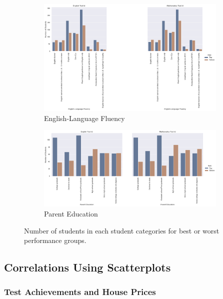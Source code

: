 \documentclass[11pt]{article}
\begin{document}
\begin{figure}[h!]
\begin{subfigure}{0.5\textwidth}
         \centering
         \includegraphics[width=\textwidth]{output_57_0.png}
         \caption{English-Language Fluency}
         \label{fig:num_best_worst_counties_english}
\end{subfigure}
\hfill
\begin{subfigure}{0.5\textwidth}
         \centering
         \includegraphics[width=\textwidth]{output_61_0.png}
         \caption{Parent Education}
         \label{fig:num_best_worst_counties_education}
\end{subfigure}

\caption{Number of students in each student categories for best or worst performance groups.}
\label{fig:num_best_worst_counties}
\end{figure}

\subsection{Correlations Using Scatterplots}
\label{Correlations Using Scatterplots}

\subsubsection{Test Achievements and House Prices}
\end{document}
